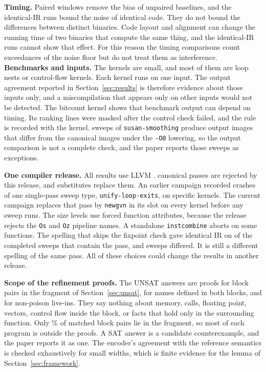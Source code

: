 \textbf{Timing.} Paired windows remove the bias of unpaired baselines, and the identical-IR runs bound the noise of identical code. They do not bound the differences between distinct binaries. Code layout and alignment can change the running time of two binaries that compute the same thing, and the identical-IR runs cannot show that effect. For this reason the timing comparisons count exceedances of the noise floor but do not treat them as interference. \textbf{Benchmarks and inputs.} The \NumKernels{} kernels are small, and most of them are loop nests or control-flow kernels. Each kernel runs on one input. The output agreement reported in Section~\ref{sec:results} is therefore evidence about those inputs only, and a miscompilation that appears only on other inputs would not be detected. The bitcount kernel shows that benchmark output can depend on timing. Its ranking lines were masked after the control check failed, and the rule is recorded with the kernel. \OutputsDiffering{} sweeps of \texttt{susan-smoothing} produce output images that differ from the canonical images under the \texttt{-O0} lowering, so the output comparison is not a complete check, and the paper reports those sweeps as exceptions.

\textbf{One compiler release.} All results use LLVM \LLVMVersion. \RejectedCanonicalCount{} canonical passes are rejected by
this release, and \SubstituteCount{} substitutes replace them. An earlier campaign recorded \ArchivedCrashes{} crashes of one single-pass sweep type, \texttt{unify-loop-exits}, on specific kernels. The current campaign replaces that pass by \texttt{newgvn} in its slot on every kernel before any sweep runs. The size levels use forced function attributes, because the release
rejects the \texttt{Os} and \texttt{Oz} pipeline names. A standalone \texttt{instcombine} aborts on some functions. The spelling that skips the fixpoint check gave identical IR on \SpellingIdentical{} of the \SpellingCandidates{} completed sweeps that contain the pass, and \SpellingDiffering{} sweeps differed. It is still a different spelling of the same pass. All of these choices could change the results in another release.

\textbf{Scope of the refinement proofs.} The UNSAT answers are proofs for block pairs in the fragment of
Section~\ref{sec:unsat}, for names defined in both blocks, and for non-poison live-ins. They say nothing about memory, calls,
floating point, vectors, control flow inside the block, or facts that hold only in the surrounding function. Only
\BlocksEncodablePct{}\% of matched block pairs lie in the fragment, so most of each program is outside the proofs. A SAT answer is a
candidate counterexample, and the paper reports it as one. The encoder's agreement with the reference semantics is checked
exhaustively for small widths, which is finite evidence for the lemma of Section~\ref{sec:framework}.

